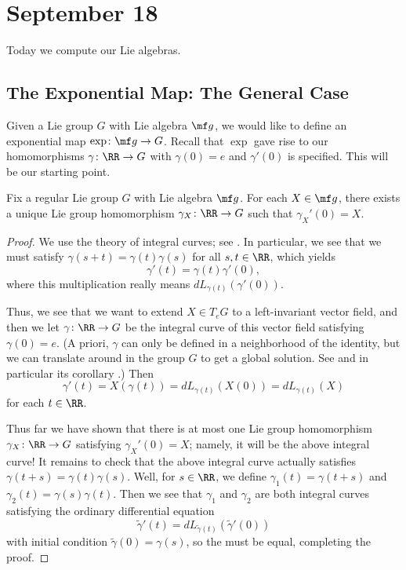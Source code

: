\documentclass[../notes.tex]{subfiles}
\begin{document}
\section{September 18}
Today we compute our Lie algebras.

\subsection{The Exponential Map: The General Case}
Given a Lie group $G$ with Lie algebra $\mf g$, we would like to define an exponential map $\exp\colon\mf g\to G$. Recall that $\exp$ gave rise to our homomorphisms $\gamma\colon\RR\to G$ with $\gamma(0)=e$ and $\gamma'(0)$ is specified. This will be our starting point.
\begin{proposition} \label{lem:integral-curve-for-exp}
	Fix a regular Lie group $G$ with Lie algebra $\mf g$. For each $X\in\mf g$, there exists a unique Lie group homomorphism $\gamma_X\colon\RR\to G$ such that $\gamma_X'(0)=X$.
\end{proposition}
\begin{proof}
	We use the theory of integral curves; see \cite[Chapter~9]{lee-manifolds}. In particular, we see that we must satisfy $\gamma(s+t)=\gamma(t)\gamma(s)$ for all $s,t\in\RR$, which yields
	\[\gamma'(t)=\gamma(t)\gamma'(0),\]
	where this multiplication really means $dL_{\gamma(t)}(\gamma'(0))$.
	
	Thus, we see that we want to extend $X\in T_eG$ to a left-invariant vector field, and then we let $\gamma\colon\RR\to G$ be the integral curve of this vector field satisfying $\gamma(0)=e$. (A priori, $\gamma$ can only be defined in a neighborhood of the identity, but we can translate around in the group $G$ to get a global solution. See \cite[Lemma~9.15]{lee-manifolds} and in particular its corollary \cite[Theorem~9.18]{lee-manifolds}.) Then
	\[\gamma'(t)=X(\gamma(t))=dL_{\gamma(t)}(X(0))=dL_{\gamma(t)}(X)\]
	for each $t\in\RR$.

	Thus far we have shown that there is at most one Lie group homomorphism $\gamma_X\colon\RR\to G$ satisfying $\gamma_X'(0)=X$; namely, it will be the above integral curve! It remains to check that the above integral curve actually satisfies $\gamma(t+s)=\gamma(t)\gamma(s)$. Well, for $s\in\RR$, we define $\gamma_1(t)=\gamma(t+s)$ and $\gamma_2(t)=\gamma(s)\gamma(t)$. Then we see that $\gamma_1$ and $\gamma_2$ are both integral curves satisfying the ordinary differential equation
	\[\widetilde\gamma'(t)=dL_{\widetilde\gamma(t)}(\widetilde\gamma'(0))\]
	with initial condition $\widetilde\gamma(0)=\gamma(s)$, so the must be equal, completing the proof.
\end{proof}
\end{document}
